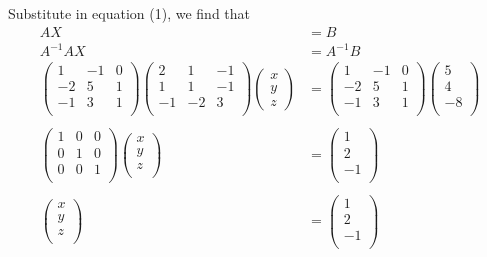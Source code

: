 \documentclass[11pt,a4paper]{article}
\begin{document}
\begin{enumerate}
Substitute in equation (1), we find that 
\begin{align*}
AX & =B\\
A^{-1}AX & =A^{-1}B\\
\begin{pmatrix}
1 & -1 & 0\\
-2 & 5 & 1\\
-1 & 3 & 1\\
\end{pmatrix}
\begin{pmatrix}
2 & 1 & -1\\
1 & 1 & -1\\
-1 & -2 & 3\\
\end{pmatrix}
\begin{pmatrix}
x\\y\\z
\end{pmatrix}
& =
\begin{pmatrix}
1 & -1 & 0\\
-2 & 5 & 1\\
-1 & 3 & 1\\
\end{pmatrix}
\begin{pmatrix}
5\\4\\-8\\
\end{pmatrix}\\\\
\begin{pmatrix}
1 & 0 & 0\\
0 & 1 & 0\\
0 & 0 & 1\\
\end{pmatrix}
\begin{pmatrix}
x\\y\\z\\
\end{pmatrix}
&=
\begin{pmatrix}
1\\ 2\\ -1\\
\end{pmatrix}\\\\
\begin{pmatrix}
x\\y\\z\\
\end{pmatrix}
&=
\begin{pmatrix}
1\\2\\-1\\
\end{pmatrix}
\end{align*}


\end{enumerate}
\end{document}
